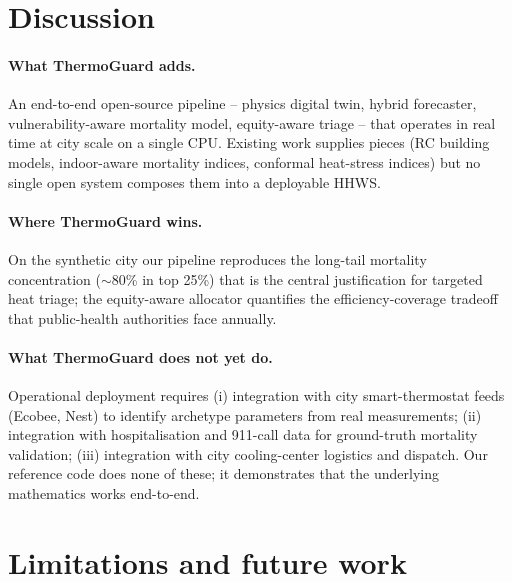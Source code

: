 \documentclass[11pt]{article}
\begin{document}
\section{Discussion}

\paragraph{What ThermoGuard adds.}  An end-to-end open-source pipeline -- physics digital twin, hybrid forecaster, vulnerability-aware mortality model, equity-aware triage -- that operates in real time at city scale on a single CPU.  Existing work supplies pieces (RC building models, indoor-aware mortality indices, conformal heat-stress indices) but no single open system composes them into a deployable HHWS.

\paragraph{Where ThermoGuard wins.}  On the synthetic city our pipeline reproduces the long-tail mortality concentration ($\sim$80\% in top 25\%) that is the central justification for targeted heat triage; the equity-aware allocator quantifies the efficiency-coverage tradeoff that public-health authorities face annually.

\paragraph{What ThermoGuard does not yet do.}  Operational deployment requires (i) integration with city smart-thermostat feeds (Ecobee, Nest) to identify archetype parameters from real measurements; (ii) integration with hospitalisation and 911-call data for ground-truth mortality validation; (iii) integration with city cooling-center logistics and dispatch.  Our reference code does none of these; it demonstrates that the underlying mathematics works end-to-end.

\section{Limitations and future work}
\label{sec:limits}
\end{document}

